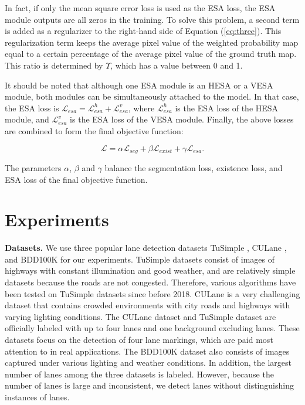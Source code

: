 \documentclass[10pt,twocolumn,letterpaper]{article}
\begin{document}
In fact, if only the mean square error loss is used as the ESA loss, the ESA module outputs are all zeros in the training. To solve this problem, a second term is added as a regularizer to the right-hand side of Equation (\ref{eq:three}). This regularization term keeps the average pixel value of the weighted probability map equal to a certain percentage of the average pixel value of the ground truth map. This ratio is determined by $\Upsilon$, which has a value between 0 and 1.

It should be noted that although one ESA module is an HESA or a VESA module, both modules can be simultaneously attached to the model. In that case, the ESA loss is $\mathcal{L}_{esa}=\mathcal{L}^{h}_{esa}+\mathcal{L}^{v}_{esa}$, where $\mathcal{L}^{h}_{esa}$ is the ESA loss of the HESA module, and $\mathcal{L}^{v}_{esa}$ is the ESA loss of the VESA module. Finally, the above losses are combined to form the final objective function:

\begin{equation}
	\mathcal{L}=\alpha\mathcal{L}_{seg}+\beta\mathcal{L}_{exist}+\gamma\mathcal{L}_{esa}.
	\label{eq:four}
\end{equation}

\noindent
The parameters $\alpha$, $\beta$ and $\gamma$ balance the segmentation loss, existence loss, and ESA loss of the final objective function.

\section{Experiments}
\noindent
\textbf{Datasets.} We use three popular lane detection datasets TuSimple \cite{tusimple}, CULane \cite{pan2017spatial}, and BDD100K \cite{yu2018bdd100k} for our experiments. TuSimple datasets consist of images of highways with constant illumination and good weather, and are relatively simple datasets because the roads are not congested. Therefore, various algorithms \cite{pan2017spatial, neven2018towards, ghafoorian2018gan, hou2019learning, jung2020towards} have been tested on TuSimple datasets since before 2018. CULane is a very challenging dataset that contains crowded environments with city roads and highways with varying lighting conditions. The CULane dataset and TuSimple dataset are officially labeled with up to four lanes and one background excluding lanes. These datasets focus on the detection of four lane markings, which are paid most attention to in real applications. The BDD100K dataset also consists of images captured under various lighting and weather conditions. In addition, the largest number of lanes among the three datasets is labeled. However, because the number of lanes is large and inconsistent, we detect lanes without distinguishing instances of lanes.
\end{document}
